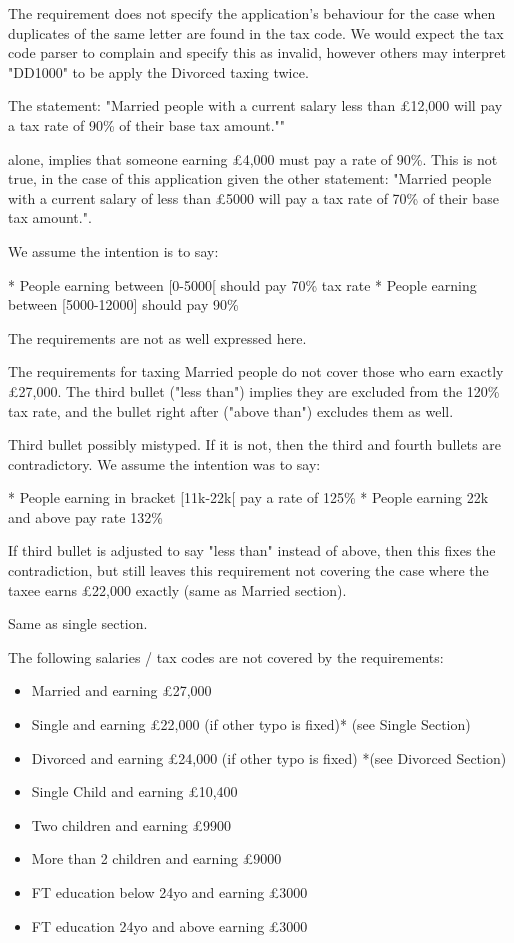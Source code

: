 The requirement does not specify the application's behaviour for the case when duplicates of the same letter are found in the tax code. We would expect the tax code parser to complain and specify this as invalid, however others may interpret "DD1000" to be apply the Divorced taxing twice. 


The statement: "Married people with a current salary less than £12,000 will pay a tax rate of 90\% of their base tax amount.""

alone, implies that someone earning £4,000 must pay a rate of 90\%. This is not true, in the case of this application given the other statement: "Married people with a current salary of less than £5000 will pay a tax rate of 70\% of their base tax amount.". 

We assume the intention is to say: 

* People earning between [0-5000[ should pay 70\% tax rate 
* People earning between [5000-12000] should pay 90\%

The requirements are not as well expressed here. 

The requirements for taxing Married people do not cover those who earn exactly £27,000. The third bullet ("less than") implies they are excluded from the 120\% tax rate, and the bullet right after ("above than") excludes them as well. 

Third bullet possibly mistyped. If it is not, then the third and fourth bullets are contradictory. We assume the intention was to say:  

* People earning in bracket [11k-22k[ pay a rate of 125\%
* People earning 22k and above pay rate 132\%

If third bullet is adjusted to say "less than" instead of above, then this fixes the contradiction, but still leaves this requirement not covering the case where the taxee earns £22,000 exactly (same as Married section). 

Same as single section. 

The following salaries / tax codes are not covered by the requirements: 
\begin{itemize}
	\item Married and earning £27,000
	\item Single and earning £22,000 (if other typo is fixed)* (see Single Section)
	\item Divorced and earning £24,000 (if other typo is fixed) *(see Divorced Section)
	\item Single Child and earning £10,400
	\item Two children and earning £9900
	\item More than 2 children and earning £9000
	\item FT education below 24yo and earning £3000
	\item FT education 24yo and above earning £3000
\end{itemize}

